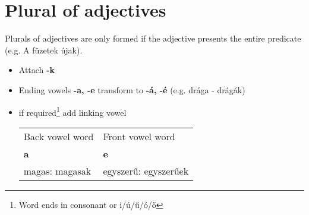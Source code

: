 \documentclass{article}
\begin{document}
\section{Plural of adjectives}
Plurals of adjectives are only formed if the adjective presents the entire predicate (e.g. A füzetek újak).
\begin{itemize}
\item Attach \textbf{-k}
\item Ending vowels \textbf{-a, -e} transform to \textbf{-á, -é} (e.g. drága - drágák)
\item if required\footnote{Word ends in consonant or i/ú/ű/ó/ő} add linking vowel \\
\begin{tabularx} {\textwidth}{ X X } \toprule
	Back vowel word & Front vowel word \\ 
	\textbf{a} & \textbf{e} \\ \midrule
	magas: magasak & egyszerű: egyszerűek \\ \bottomrule
\end{tabularx}
\end{itemize}
\end{document}
